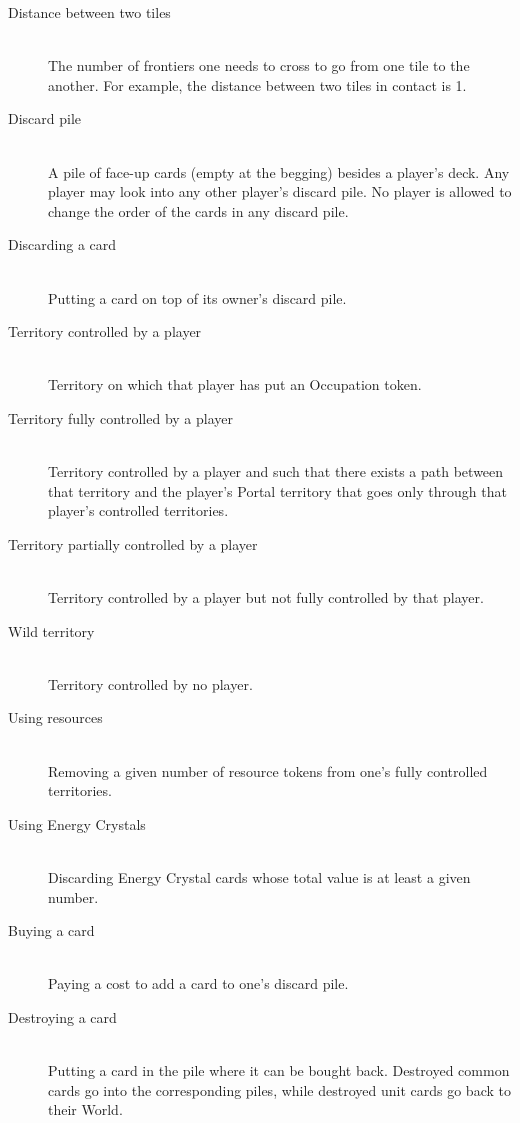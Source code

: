 \documentclass[a4paper]{article}
\begin{document}
    \begin{description}
        \item[Distance between two tiles] \hfill \\
            The number of frontiers one needs to cross to go from one tile to the another.
            For example, the distance between two tiles in contact is 1.
        \item[Discard pile] \hfill \\
            A pile of face-up cards (empty at the begging) besides a player's deck.
            Any player may look into any other player's discard pile.
            No player is allowed to change the order of the cards in any discard pile.
        \item[Discarding a card] \hfill \\
            Putting a card on top of its owner's discard pile.
        \item[Territory controlled by a player] \hfill \\
            Territory on which that player has put an Occupation token.
        \item[Territory fully controlled by a player] \hfill \\
            Territory controlled by a player and such that there exists a path
            between that territory and the player's Portal territory that
            goes only through that player's controlled territories.
        \item[Territory partially controlled by a player] \hfill \\
            Territory controlled by a player but not fully controlled by that player.
        \item[Wild territory] \hfill \\
            Territory controlled by no player.
        \item[Using resources] \hfill \\
            Removing a given number of resource tokens from one's fully controlled
            territories.
        \item[Using Energy Crystals] \hfill \\
            Discarding Energy Crystal cards whose total value is at least a given number.
        \item[Buying a card] \hfill \\
            Paying a cost to add a card to one's discard pile.
        \item[Destroying a card] \hfill \\
            Putting a card in the pile where it can be bought back.
            Destroyed common cards go into the corresponding piles,
            while destroyed unit cards go back to their World.
    \end{description}
\end{document}
